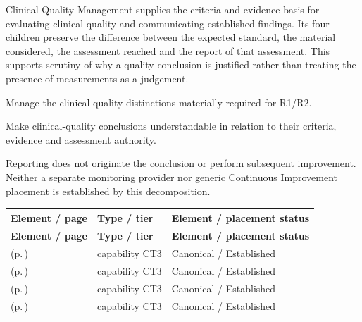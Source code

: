 Clinical Quality Management supplies the criteria and evidence basis for evaluating clinical quality and communicating established findings. Its four children preserve the difference between the expected standard, the material considered, the assessment reached and the report of that assessment. This supports scrutiny of why a quality conclusion is justified rather than treating the presence of measurements as a judgement.



Manage the clinical-quality distinctions materially required for R1/\allowbreak{}R2.



Make clinical-quality conclusions understandable in relation to their criteria, evidence and assessment authority.



Reporting does not originate the conclusion or perform subsequent improvement. Neither a separate monitoring provider nor generic Continuous Improvement placement is established by this decomposition.


\begingroup\small\setlength{\TableWidth}{\dimexpr\linewidth-6\tabcolsep-4\arrayrulewidth\relax}
\begin{longtable}{|>{\raggedright\arraybackslash}p{0.52\TableWidth}|>{\raggedright\arraybackslash}p{0.2\TableWidth}|>{\raggedright\arraybackslash}p{0.28\TableWidth}|}
\hline\rowcolor{TableHead}\textbf{Element / page} & \textbf{Type / tier} & \textbf{Element / placement status}\\\hline\endfirsthead
\hline\rowcolor{TableHead}\textbf{Element / page} & \textbf{Type / tier} & \textbf{Element / placement status}\\\hline\endhead
\hline\endfoot
\nameref{cap:bc-clinical-quality-criteria-management} (p.\,\pageref{cap:bc-clinical-quality-criteria-management}) & capability CT3 & Canonical / Established\\\hline
\nameref{cap:bc-clinical-quality-evidence-management} (p.\,\pageref{cap:bc-clinical-quality-evidence-management}) & capability CT3 & Canonical / Established\\\hline
\nameref{cap:bc-clinical-quality-review-assessment-management} (p.\,\pageref{cap:bc-clinical-quality-review-assessment-management}) & capability CT3 & Canonical / Established\\\hline
\nameref{cap:bc-clinical-quality-reporting} (p.\,\pageref{cap:bc-clinical-quality-reporting}) & capability CT3 & Canonical / Established\\\hline
\end{longtable}\endgroup

